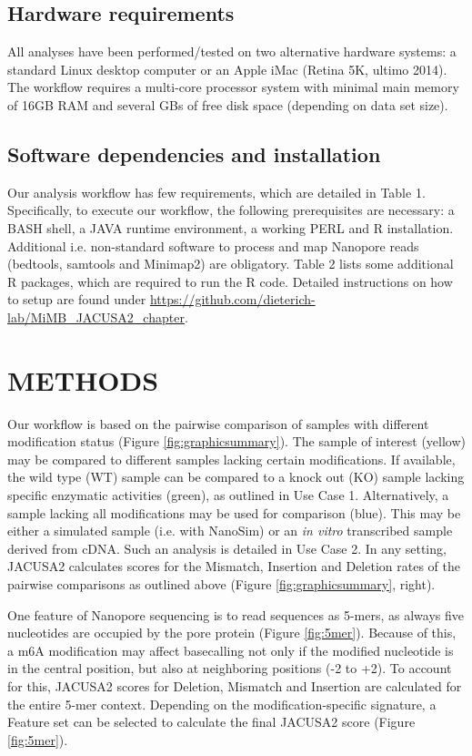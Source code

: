 \documentclass[times, 11pt, a4paper]{article}
\begin{document}
\subsection*{Hardware requirements}
All analyses have been performed/tested on two alternative hardware systems:
a standard Linux desktop computer or an Apple iMac (Retina 5K, ultimo 2014).
The workflow requires a multi-core processor system with minimal main memory of 16GB RAM
and several GBs of free disk space (depending on data set size).

\subsection*{Software dependencies and installation}
Our analysis workflow has few requirements, which are detailed in Table 1. Specifically, to execute our workflow, the following prerequisites are necessary: a BASH shell, a JAVA runtime environment, a working PERL and R installation. Additional i.e. non-standard software to process and map Nanopore reads (bedtools, samtools and Minimap2) are obligatory. Table 2 lists some additional R packages, which are required to run the R code. Detailed instructions on how to setup are found under \url{https://github.com/dieterich-lab/MiMB_JACUSA2_chapter}.

\section*{METHODS}
Our workflow is based on the pairwise comparison of samples with different modification status (Figure \ref{fig:graphicsummary}). The sample of interest (yellow) may be compared to different samples lacking certain modifications. If available, the wild type (WT) sample can be compared to a knock out (KO) sample lacking specific enzymatic activities (green), as outlined in Use Case 1. Alternatively, a sample lacking all modifications may be used for comparison (blue). This may be either a simulated sample (i.e. with NanoSim) or an \textit{in vitro} transcribed sample derived from cDNA. Such an analysis is detailed in Use Case 2. In any setting, JACUSA2 calculates scores for the Mismatch, Insertion and Deletion rates of the pairwise comparisons as outlined above (Figure \ref{fig:graphicsummary}, right).

One feature of Nanopore sequencing is to read sequences as 5-mers, as always five nucleotides are occupied by the pore protein (Figure \ref{fig:5mer}). Because of this, a m6A modification may affect basecalling not only if the modified nucleotide is in the central position, but also at neighboring positions (-2 to +2). To account for this, JACUSA2 scores for Deletion, Mismatch and Insertion are calculated for the entire 5-mer context. Depending on the modification-specific signature, a Feature set can be selected to calculate the final JACUSA2 score (Figure \ref{fig:5mer}).
\end{document}
